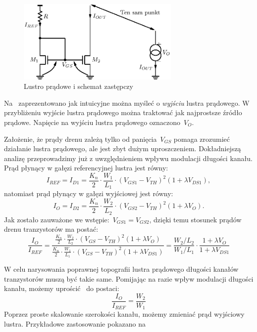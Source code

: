 \documentclass[twoside,pl,final]{labman}
\begin{document}
\begin{figure}[!htbp]
  \centering
  \includegraphics[width=0.7\textwidth]{equiv}
  \caption{Lustro prądowe i schemat zastępczy}
  \label{fig:basic:equiv}
\end{figure}

Na~ zaprezentowano jak intuicyjne można
myśleć o \emph{wyjściu} lustra prądowego.
W przybliżeniu wyjście lustra prądowego można traktować
jak najprostsze źródło prądowe.
Napięcie na wyjściu lustra prądowego oznaczono~$V_O$.

Założenie, że prądy drenu zależą tylko od panięcia~$V_{GS}$
pomaga zrozumieć działanie lustra prądowego,
ale jest zbyt dużym uproszczeniem.
Dokładniejszą analizę przeprowadzimy już z uwzględnieniem wpływu
modulacji długości kanału.
Prąd płynący w gałęzi referencyjnej lustra jest równy:
\begin{equation}
  I_{REF} = I_{D1} = \frac{K_n}{2} \cdot \frac{W_1}{L_1} \cdot
    (V_{GS1} - V_{TH}) ^ 2 (1 + \lambda V_{DS1}),
  \label{eqn:basic:iref}
\end{equation}
natomiast prąd płynący w gałęzi wyjściowej jest równy:
\begin{equation}
  I_O = I_{D2} = \frac{K_n}{2} \cdot \frac{W_2}{L_2} \cdot
    (V_{GS2} - V_{TH}) ^ 2 (1 + \lambda V_O).
  \label{eqn:basic:iout}
\end{equation}
Jak zostało zauważone we wstępie:~$V_{GS1} = V_{GS2}$,
dzięki temu stosunek prądów drenu tranzystorów ma postać:
\begin{equation}
  \frac{I_O}{I_{REF}} =
  \frac{\frac{K_n}{2} \cdot \frac{W_2}{L_2} \cdot (V_{GS} - V_{TH}) ^ 2 (1 + \lambda V_O)}
  {\frac{K_n}{2} \cdot \frac{W_1}{L_1} \cdot (V_{GS} - V_{TH}) ^ 2 (1 + \lambda V_{DS1})} =
  \frac{W_2 / L_2}{W_1 / L_1}
    \cdot \frac{1 + \lambda V_{O}}{1 + \lambda V_{DS1}}
  \label{eqn:basic:iratio}
\end{equation}

W celu narysowania poprawnej topografii lustra prądowego
długości kanałów tranzystorów muszą być takie same.
Pomijając na razie wpływ modulacji długości kanału,
możemy uprościć~ do postaci:
\begin{equation}
  \frac{I_O}{I_{REF}} = \frac{W_2}{W_1}
  \label{eqn:basic:wratio}
\end{equation}
Poprzez proste skalowanie szerokości kanału,
możemy zmieniać prąd wyjściowy lustra.
Przykładowe zastosowanie pokazano na~
\end{document}
